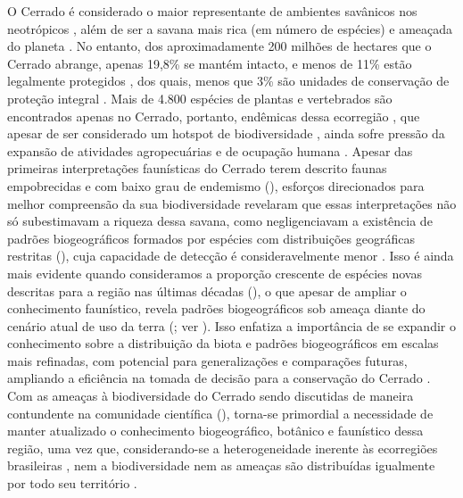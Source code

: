\documentclass[12pt,openright,oneside,a4paper,english]{abntex2}
\begin{document}
O Cerrado é considerado o maior representante de ambientes savânicos nos neotrópicos \citep{Silva2002}, além de ser a savana mais rica (em número de espécies) e ameaçada do planeta \citep{KlinkMachado2005}. No entanto, dos aproximadamente 200 milhões de hectares que o Cerrado abrange, apenas 19,8\% se mantém intacto, e menos de 11\% estão legalmente protegidos , dos quais, menos que 3\% são unidades de conservação de proteção integral \citep{Strassburg2017, VieiraAlencar2023}. Mais de 4.800 espécies de plantas e vertebrados são encontrados apenas no Cerrado, portanto, endêmicas dessa ecorregião \citep{Strassburg2017}, que apesar de ser considerado um hotspot de biodiversidade \citep{Myers2000}, ainda sofre pressão da expansão de atividades agropecuárias e de ocupação humana \citep{KlinkMachado2005, Strassburg2017}. Apesar das primeiras interpretações faunísticas do Cerrado terem descrito faunas empobrecidas e com baixo grau de endemismo (\citealp[ver revisão em][]{Nogueira2010}), esforços direcionados para melhor compreensão da sua biodiversidade revelaram que essas interpretações não só subestimavam a riqueza dessa savana, como negligenciavam a existência de padrões biogeográficos formados por espécies com distribuições geográficas restritas (\citealp[ver][]{Nogueira2010}), cuja capacidade de detecção é consideravelmente menor \citep{Gaston1996}. Isso é ainda mais evidente quando consideramos a proporção crescente de espécies novas descritas para a região nas últimas décadas (\citealp[ver][]{Nogueira2010}), o que apesar de ampliar o conhecimento faunístico, revela padrões biogeográficos sob ameaça diante do cenário atual de uso da terra (\citealp{Strassburg2017}; ver ). Isso enfatiza a importância de se expandir o conhecimento sobre a distribuição da biota e padrões biogeográficos em escalas mais refinadas, com potencial para generalizações e comparações futuras, ampliando a eficiência na tomada de decisão para a conservação do Cerrado \citep{DinizFilho2008}. Com as ameaças à biodiversidade do Cerrado sendo discutidas de maneira contundente na comunidade científica (\citealp[e.g][]{KlinkMachado2005, Strassburg2017, Velazco2019, Pacheco2021}), torna-se primordial a necessidade de manter atualizado o conhecimento biogeográfico, botânico e faunístico dessa região, uma vez que, considerando-se a heterogeneidade inerente às ecorregiões brasileiras \citep{Ratter2003, Bridgewater2004}, nem a biodiversidade nem as ameaças são distribuídas igualmente por todo seu território \citep{Ratter2003, KlinkMachado2005, Nogueira2011, Azevedo2016, Carmignotto2022}.
\end{document}
